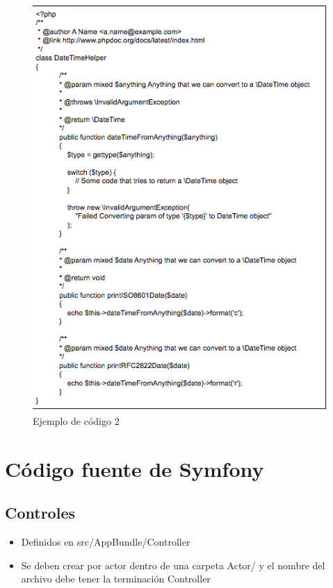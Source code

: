 				\begin{figure}[htbp!]
		\centering
			\includegraphics[width=1\textwidth]{images/ejemploCodigo2}
		\caption{Ejemplo de código 2}
	\end{figure}
				
\section{Código fuente de Symfony}
\subsection{Controles}
\begin{itemize}
\item Definidos en src/AppBundle/Controller

\item Se deben crear por actor dentro de una carpeta Actor/ y el nombre del archivo debe tener la terminación Controller

\end{itemize}
